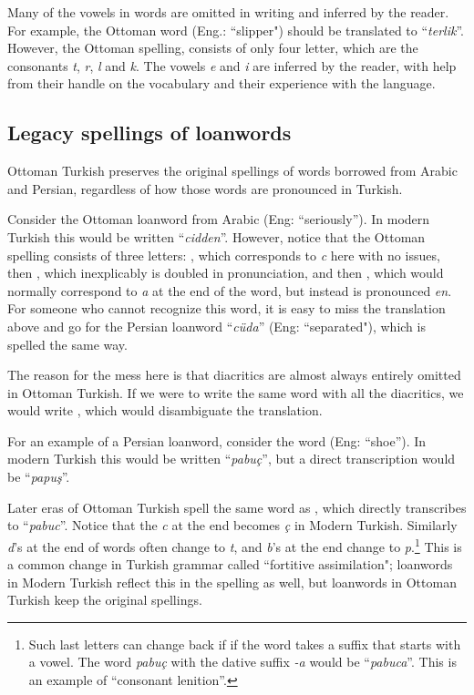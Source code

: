 \documentclass[10pt,twocolumn]{article}
\theoremstyle{nonumberplain}
\newcommand{\otto}[1]{\RLE{\ottoman{}\Large{}#1}}
\newcommand{\word}[1]{``\emph{#1}''}
\begin{document}
Many of the vowels in words are omitted in writing and inferred by the reader.
For example, the Ottoman word \otto{ترلك} (Eng.: ``slipper") should be
translated to \word{terlik}.
However, the Ottoman spelling, consists of only four letter, which are the
consonants \emph{t}, \emph{r}, \emph{l} and \emph{k}.
The vowels \emph{e} and \emph{i} are inferred by the reader, with help from
their handle on the vocabulary and their experience with the language.

\subsection{Legacy spellings of loanwords}

Ottoman Turkish preserves the original spellings of words borrowed from
Arabic and Persian, regardless of how those words are pronounced in Turkish.

Consider the Ottoman loanword from Arabic \otto{جدا} (Eng: ``seriously''). In
modern Turkish this would be written \word{cidden}. However, notice that the
Ottoman spelling consists of three letters: \otto{ج}, which corresponds to
\emph{c} here with no issues, then \otto{د}, which inexplicably is doubled in
pronunciation, and then \otto{ا}, which would normally correspond to
\emph{a} at the end of the word, but instead is pronounced \emph{en}.
For someone who cannot recognize this word, it is easy to miss the translation above and go for
the Persian loanword \word{cüda} (Eng: ``separated"), which is spelled the same way.

The reason for the mess here is that diacritics are almost always entirely omitted in Ottoman Turkish.
If we were to write the same word with all the diacritics, we would write
\otto{جِدًّا}, which would disambiguate the translation.

For an example of a Persian loanword, consider the word \otto{پاپوش} (Eng: ``shoe'').
In modern Turkish this would be written \word{pabuç}, but a direct
transcription would be \word{papuş}.

Later eras of Ottoman Turkish spell the same word as \otto{پابوج}, which
directly transcribes to \word{pabuc}. Notice that the \emph{c} at the end becomes
\emph{ç} in Modern Turkish. Similarly \emph{d}'s at the end of words
often change to \emph{t}, and \emph{b}'s at the end change to
\emph{p}.\footnote{Such last letters can change back if if the word takes a
suffix that starts with a vowel. The word \emph{pabuç} with the dative suffix
\emph{-a} would be \word{pabuca}. This is an example of ``consonant lenition''.}
This is a common change in Turkish grammar called
``fortitive assimilation"; loanwords in Modern Turkish reflect this in the
spelling as well, but loanwords in Ottoman Turkish keep the original spellings.
\end{document}
